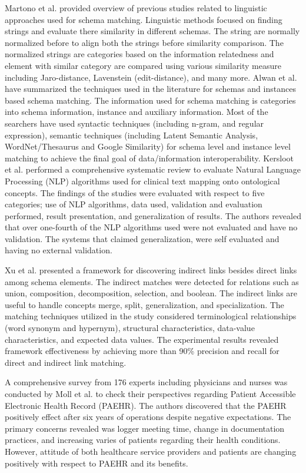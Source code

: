 \documentclass{ieeeaccess}
\begin{document}
Martono et al. \cite{martono2017review} provided overview of previous studies related to linguistic approaches used for schema matching. Linguistic methods focused on finding strings and evaluate there similarity in different schemas. The string are normally normalized before to align both the strings before similarity comparison. The normalized strings are categories based on the information relatedness and element with similar category are compared using various similarity measure including  Jaro-distance, Lavenstein (edit-distance), and many more. Alwan et al. \cite{alwan2017survey} have summarized the techniques used in the literature for schemas and instances based schema matching. The information used for schema matching is categories into  schema information, instance and auxiliary information. Most of the searchers have used syntactic techniques (including n-gram, and regular expression), semantic techniques (including Latent Semantic Analysis, WordNet/Thesaurus and Google Similarity) for schema level and instance level matching to achieve the final goal of data/information interoperability.  Kersloot et al. \cite{kersloot2020natural} performed a comprehensive systematic review to evaluate Natural Language Processing (NLP) algorithms used for clinical text mapping onto ontological concepts. The findings of the studies were evaluated with respect to five categories; use of NLP algorithms, data used, validation and evaluation performed, result presentation, and generalization of results. The authors revealed that over one-fourth of the NLP algorithms used were not evaluated and have no validation. The systems that claimed generalization, were self evaluated and having no external validation.  

Xu et al. \cite{xu2003discovering} presented a framework for discovering indirect links besides direct links among schema elements. The indirect matches were detected for relations such as union, composition, decomposition, selection, and boolean. The indirect links are useful to handle concepts merge, split, generalization, and specialization. The matching techniques utilized in the study considered terminological relationships (word synonym and hypernym), structural characteristics, data-value characteristics, and expected data values. The experimental results revealed framework effectiveness by achieving more than 90\% precision and recall for direct and indirect link matching. 

A comprehensive survey from 176 experts including physicians and nurses was conducted by Moll et al. \cite{moll2020oncology} to check their perspectives regarding Patient Accessible Electronic Health Record (PAEHR). The authors discovered that the PAEHR positively effect after six years of operations despite negative expectations. The primary concerns revealed was logger meeting time, change in documentation practices, and increasing varies of patients regarding their health conditions. However, attitude of both healthcare service providers and patients are changing positively with respect to PAEHR and its benefits. 
\end{document}
